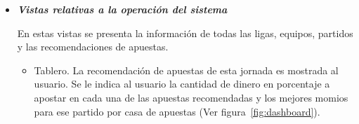 \begin{itemize}
			Estas vistas no necesitan ser actualizadas casi nunca, es decir, su contenido es estático. Las páginas estáticas son:
			\begin{itemize}
				\item FAQ. Preguntas frecuentes que ayudan al usuario a comprender más a fondo el sistema (Ver imagen~\ref{Fig:faq}).

				\begin{figure}[!htb]\centering
				   \begin {minipage}{0.75\textwidth}
				     \texttt{[image: faq]}
				     \caption{La encuesta define el perfil de riesgo del usuario}\label{Fig:faq}
				   \end{minipage}
				\end{figure}

				\item Home Page. La página que recibe a todos los que ingresan al sitio y presenta una bienvenida a los posibles clientes junto con una explicación de lo que es Egobets.com. Además de que contiene el aviso legal.
				\item Términos y condiciones. Presenta el contrato de uso al que se comprometen los clientes al utilizar el sistema.
			\end{itemize}


			\item \emph{\textbf{Vistas relativas a la operación del sistema}}


			En estas vistas se presenta la información de todas las ligas, equipos, partidos y las recomendaciones de apuestas.

			\begin{itemize}

				\item Tablero. La recomendación de apuestas de esta jornada es mostrada al usuario. Se le indica al usuario la cantidad de dinero en porcentaje a apostar en cada una de las apuestas recomendadas y los mejores momios para ese partido por casa de apuestas (Ver figura~\ref{fig:dashboard}).


\end{itemize}
\end{itemize}
